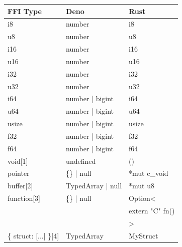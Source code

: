 \documentclass[10pt,journal,compsoc]{IEEEtran}
\begin{document}
\begin{table}[]
    \begin{tabular}{|l|l|l|}
        \hline
        FFI Type                       & Deno              & Rust              \\ \hline
        i8                             & number            & i8                \\ \hline
        u8                             & number            & u8                \\ \hline
        i16                            & number            & i16               \\ \hline
        u16                            & number            & u16               \\ \hline
        i32                            & number            & i32               \\ \hline
        u32                            & number            & u32               \\ \hline
        i64                            & number | bigint   & i64               \\ \hline
        u64                            & number | bigint   & u64               \\ \hline
        usize                          & number | bigint   & usize             \\ \hline
        f32                            & number | bigint   & f32               \\ \hline
        f64                            & number | bigint   & f64               \\ \hline
        void{[}1{]}                    & undefined         & ()                \\ \hline
        pointer                        & \{\} | null       & *mut c\_void      \\ \hline
        buffer{[}2{]}                  & TypedArray | null & *mut u8           \\ \hline
        function{[}3{]}                & \{\} | null       & Option\textless{} \\
                                       &                   & extern "C" fn()   \\
                                       &                   & \textgreater{}    \\ \hline
        \{ struct: {[}...{]} \}{[}4{]} & TypedArray        & MyStruct          \\ \hline
    \end{tabular}
\end{table}
\end{document}
